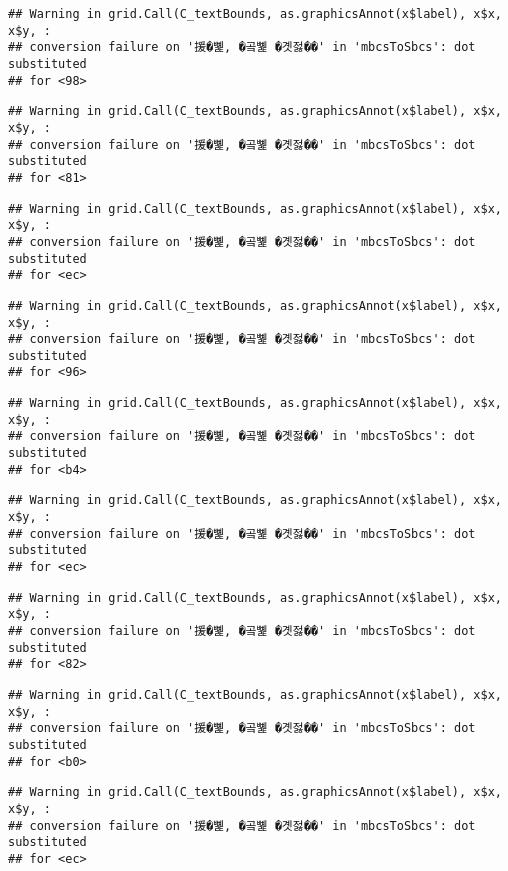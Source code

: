 \documentclass[
]{article}
\begin{document}
\begin{verbatim}
## Warning in grid.Call(C_textBounds, as.graphicsAnnot(x$label), x$x, x$y, :
## conversion failure on '援�뼱, �곸뼱 �곗젏��' in 'mbcsToSbcs': dot substituted
## for <98>
\end{verbatim}

\begin{verbatim}
## Warning in grid.Call(C_textBounds, as.graphicsAnnot(x$label), x$x, x$y, :
## conversion failure on '援�뼱, �곸뼱 �곗젏��' in 'mbcsToSbcs': dot substituted
## for <81>
\end{verbatim}

\begin{verbatim}
## Warning in grid.Call(C_textBounds, as.graphicsAnnot(x$label), x$x, x$y, :
## conversion failure on '援�뼱, �곸뼱 �곗젏��' in 'mbcsToSbcs': dot substituted
## for <ec>
\end{verbatim}

\begin{verbatim}
## Warning in grid.Call(C_textBounds, as.graphicsAnnot(x$label), x$x, x$y, :
## conversion failure on '援�뼱, �곸뼱 �곗젏��' in 'mbcsToSbcs': dot substituted
## for <96>
\end{verbatim}

\begin{verbatim}
## Warning in grid.Call(C_textBounds, as.graphicsAnnot(x$label), x$x, x$y, :
## conversion failure on '援�뼱, �곸뼱 �곗젏��' in 'mbcsToSbcs': dot substituted
## for <b4>
\end{verbatim}

\begin{verbatim}
## Warning in grid.Call(C_textBounds, as.graphicsAnnot(x$label), x$x, x$y, :
## conversion failure on '援�뼱, �곸뼱 �곗젏��' in 'mbcsToSbcs': dot substituted
## for <ec>
\end{verbatim}

\begin{verbatim}
## Warning in grid.Call(C_textBounds, as.graphicsAnnot(x$label), x$x, x$y, :
## conversion failure on '援�뼱, �곸뼱 �곗젏��' in 'mbcsToSbcs': dot substituted
## for <82>
\end{verbatim}

\begin{verbatim}
## Warning in grid.Call(C_textBounds, as.graphicsAnnot(x$label), x$x, x$y, :
## conversion failure on '援�뼱, �곸뼱 �곗젏��' in 'mbcsToSbcs': dot substituted
## for <b0>
\end{verbatim}

\begin{verbatim}
## Warning in grid.Call(C_textBounds, as.graphicsAnnot(x$label), x$x, x$y, :
## conversion failure on '援�뼱, �곸뼱 �곗젏��' in 'mbcsToSbcs': dot substituted
## for <ec>
\end{verbatim}
\end{document}
